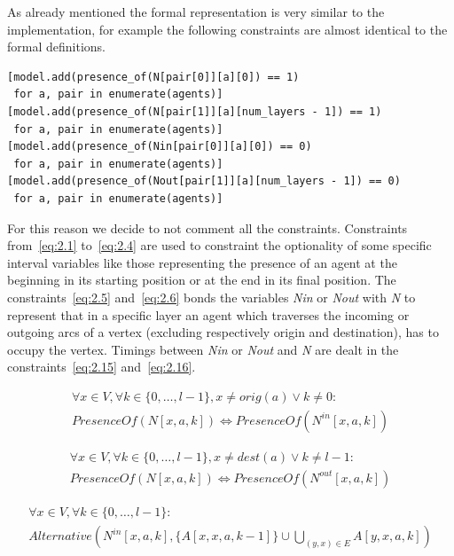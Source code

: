 \documentclass[12pt, a4paper, hidelinks]{article}
\numberwithin{equation}{section}
\begin{document}
As already mentioned the formal representation is very similar to the implementation, for example the following constraints are almost identical to the formal definitions.

\begin{lstlisting}[label={lst:eq2.1-2.4}]
[model.add(presence_of(N[pair[0]][a][0]) == 1)
 for a, pair in enumerate(agents)]
[model.add(presence_of(N[pair[1]][a][num_layers - 1]) == 1)
 for a, pair in enumerate(agents)]
[model.add(presence_of(Nin[pair[0]][a][0]) == 0)
 for a, pair in enumerate(agents)]
[model.add(presence_of(Nout[pair[1]][a][num_layers - 1]) == 0)
 for a, pair in enumerate(agents)]
\end{lstlisting}

For this reason we decide to not comment all the constraints.
Constraints from~\ref{eq:2.1} to~\ref{eq:2.4} are used to constraint the optionality of some specific interval variables like those representing the presence of an agent at the beginning in its starting position or at the end in its final position.
The constraints~\ref{eq:2.5} and~\ref{eq:2.6} bonds the variables \textit{Nin} or \textit{Nout} with \textit{N} to represent that in a specific layer an agent which traverses the incoming or outgoing arcs of a vertex (excluding respectively origin and destination), has to occupy the vertex.
Timings between \textit{Nin} or \textit{Nout} and \textit{N} are dealt in the constraints~\ref{eq:2.15} and~\ref{eq:2.16}.

\begin{description}\label{eq:equation_set_2.2}
\item \begin{equation}\begin{split} \forall x \in V, \forall k \in \{0,\dots,l-1\}, x \neq orig(a) \lor k \neq 0: \\ PresenceOf(N[x,a,k]) \iff PresenceOf(N^{in}[x,a,k]) \end{split}\label{eq:2.5}\end{equation}
\item \begin{equation}\begin{split} \forall x \in V, \forall k \in \{0,\dots,l-1\}, x \neq dest(a) \lor k \neq l-1: \\ PresenceOf(N[x,a,k]) \iff PresenceOf(N^{out}[x,a,k]) \end{split}\label{eq:2.6}\end{equation}
\item \begin{equation}\begin{split} \forall x \in V, \forall k \in \{0,\dots,l-1\}: \\ Alternative(N^{in}[x,a,k], \{A[x,x,a,k-1]\} \cup \bigcup_{(y,x) \in E} A[y,x,a,k]) \end{split}\label{eq:2.7}\end{equation}
\end{description}
\end{document}
